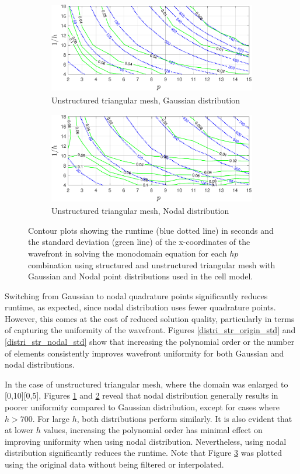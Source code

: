\begin{figure}[h!]
    \begin{subfigure}{0.45\textwidth}
        \centering
        \includegraphics[width=\linewidth, height=4cm]{figs/distri_unstr_origin_std.pdf}  
        \caption{Unstructured triangular mesh, Gaussian distribution}
        \label{distri_unstr_origin_std}
    \end{subfigure}
    \begin{subfigure}{0.45\textwidth}
        \centering
        \includegraphics[width=\linewidth, height=4cm]{figs/distri_unstr_nodal_std.pdf} 
        \caption{Unstructured triangular mesh, Nodal distribution}
        \label{distri_unstr_nodal_std}
    \end{subfigure}
    
    \caption{Contour plots showing the runtime (blue dotted line) in seconds and the standard deviation (green line) of the x-coordinates of the wavefront in solving the monodomain equation for each $hp$ combination using structured and unstructured triangular mesh with Gaussian and Nodal point distributions used in the cell model.}
    \label{distri_str}
\end{figure}
Switching from Gaussian to nodal quadrature points significantly reduces runtime, as expected, since nodal distribution uses fewer quadrature points. However, this comes at the cost of reduced solution quality, particularly in terms of capturing the uniformity of the wavefront. Figures \ref{distri_str_origin_std} and \ref{distri_str_nodal_std} show that increasing the polynomial order or the number of elements consistently improves wavefront uniformity for both Gaussian and nodal distributions.
\par
In the case of unstructured triangular mesh, where the domain was enlarged to [0,10][0,5], Figures \ref{distri_unstr_origin_std} and \ref{distri_unstr_nodal_std} reveal that nodal distribution generally results in poorer uniformity compared to Gaussian distribution, except for cases where $h > 700$. For large $h$, both distributions perform similarly. It is also evident that at lower $h$ values, increasing the polynomial order has minimal effect on improving uniformity when using nodal distribution. Nevertheless, using nodal distribution significantly reduces the runtime. Note that Figure \ref{distri_str} was plotted using the original data without being filtered or interpolated. 
